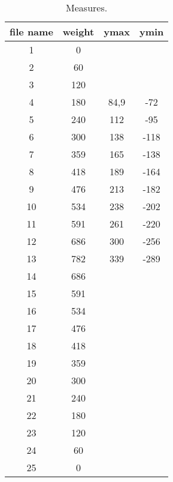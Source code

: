 \begin{table}[h]
  \centering
  \begin{tabular}{c|c|c|c}
      file name & weight & ymax & ymin \\
			\hline
      1 & 0 &  &  \\
      2 & 60 &  &  \\
      3 & 120 &  &  \\
      4 & 180 & 84,9 & -72 \\
      5 & 240 & 112 & -95 \\
      6 & 300 & 138 & -118 \\
      7 & 359 & 165 & -138 \\
      8 & 418 & 189 & -164 \\
      9 & 476 & 213 & -182 \\
      10 & 534 & 238 & -202 \\
      11 & 591 & 261 & -220 \\
      12 & 686 & 300 & -256 \\
      13 & 782 & 339 & -289 \\
      14 & 686 &  &  \\
      15 & 591 &  &  \\
      16 & 534 &  &  \\
      17 & 476 &  &  \\
      18 & 418 &  &  \\
      19 & 359 &  &  \\
      20 & 300 &  &  \\
      21 & 240 &  &  \\
      22 & 180 &  &  \\
      23 & 120 &  &  \\
      24 & 60 &  &  \\
      25 & 0 &  &  \\



  \end{tabular}
  \caption{Measures.}
  \label{table:measures}
\end{table}
